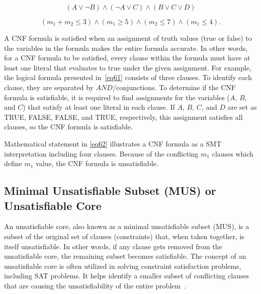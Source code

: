         \begin{equation}
            (A \vee \neg B) \wedge (\neg A \vee C) \wedge (B \vee C \vee D)
            \label{eq61}
        \end{equation}
        
            \begin{equation}
            (m_1 + m_2 \leq 3) \wedge (m_1 \geq 5) \wedge ( m_2 \leq 7) \wedge ( m_1 \leq 4).
            \label{eq62}
        \end{equation}\newline
        
    A CNF formula is satisfied when an assignment of truth values (true or false) to the variables in the formula makes the entire formula accurate. In other words, for a CNF formula to be satisfied, every clause within the formula must have at least one literal that evaluates to true under the given assignment. For example, the logical formula presented in~\eqref{eq61} consists of three clauses. To identify each clause, they are separated by $AND$/conjunctions. To determine if the CNF formula is satisfiable, it is required to find assignments for the variables ($A$, $B$, and $C$) that satisfy at least one literal in each clause. If $A$, $B$, $C$, and $D$ are set as TRUE, FALSE, FALSE, and TRUE, respectively, this assignment satisfies all clauses, so the CNF formula is satisfiable.
    
    Mathematical statement in \eqref{eq62} illustrates a CNF formula as a SMT interpretation including four clauses. Because of the conflicting $m_1$ clauses which define $m_1$ value, the CNF formula is unsatisfiable. 
    
    
    \subsection{Minimal Unsatisfiable Subset (MUS) or Unsatisfiable Core}
    
    An unsatisfiable core, also known as a minimal unsatisfiable subset (MUS), is a subset of the original set of clauses (constraints) that, when taken together, is itself unsatisfiable. In other words, if any clause gets removed from the unsatisfiable core, the remaining subset becomes satisfiable.
    The concept of an unsatisfiable core is often utilized in solving constraint satisfaction problems, including SAT problems. It helps identify a smaller subset of conflicting clauses that are causing the unsatisfiability of the entire problem~\cite{sulflow2008using,biere2009handbook}.

